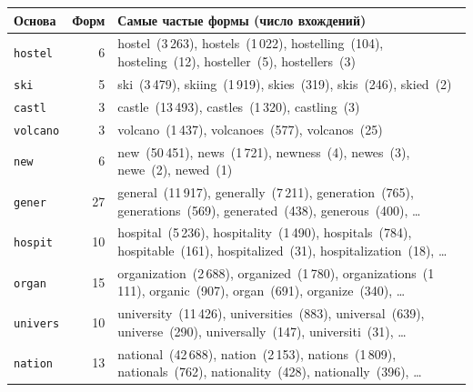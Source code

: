 \begin{tabular}{|l|r|p{}|}
\hline
Основа & Форм & Самые частые формы (число вхождений) \\
\hline
\texttt{hostel} & 6 & hostel~(3\,263), hostels~(1\,022), hostelling~(104), hosteling~(12), hosteller~(5), hostellers~(3) \\
\hline
\texttt{ski} & 5 & ski~(3\,479), skiing~(1\,919), skies~(319), skis~(246), skied~(2) \\
\hline
\texttt{castl} & 3 & castle~(13\,493), castles~(1\,320), castling~(3) \\
\hline
\texttt{volcano} & 3 & volcano~(1\,437), volcanoes~(577), volcanos~(25) \\
\hline
\texttt{new} & 6 & new~(50\,451), news~(1\,721), newness~(4), newes~(3), newe~(2), newed~(1) \\
\hline
\texttt{gener} & 27 & general~(11\,917), generally~(7\,211), generation~(765), generations~(569), generated~(438), generous~(400), \ldots \\
\hline
\texttt{hospit} & 10 & hospital~(5\,236), hospitality~(1\,490), hospitals~(784), hospitable~(161), hospitalized~(31), hospitalization~(18), \ldots \\
\hline
\texttt{organ} & 15 & organization~(2\,688), organized~(1\,780), organizations~(1\,111), organic~(907), organ~(691), organize~(340), \ldots \\
\hline
\texttt{univers} & 10 & university~(11\,426), universities~(883), universal~(639), universe~(290), universally~(147), universiti~(31), \ldots \\
\hline
\texttt{nation} & 13 & national~(42\,688), nation~(2\,153), nations~(1\,809), nationals~(762), nationality~(428), nationally~(396), \ldots \\
\hline
\end{tabular}
